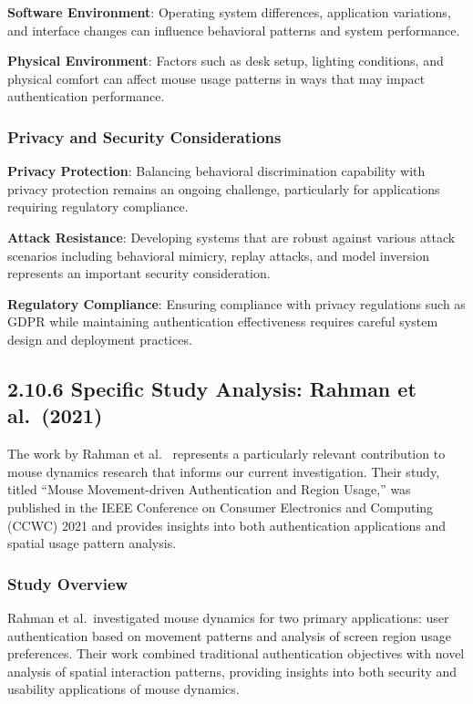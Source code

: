 \documentclass[
  12pt,
  a4paper,
]{report}
\begin{document}
\textbf{Software Environment}: Operating system differences, application
variations, and interface changes can influence behavioral patterns and
system performance.

\textbf{Physical Environment}: Factors such as desk setup, lighting
conditions, and physical comfort can affect mouse usage patterns in ways
that may impact authentication performance.

\subsubsection{Privacy and Security
Considerations}\label{privacy-and-security-considerations-1}

\textbf{Privacy Protection}: Balancing behavioral discrimination
capability with privacy protection remains an ongoing challenge,
particularly for applications requiring regulatory compliance.

\textbf{Attack Resistance}: Developing systems that are robust against
various attack scenarios including behavioral mimicry, replay attacks,
and model inversion represents an important security consideration.

\textbf{Regulatory Compliance}: Ensuring compliance with privacy
regulations such as GDPR while maintaining authentication effectiveness
requires careful system design and deployment practices.

\subsection{2.10.6 Specific Study Analysis: Rahman et
al.~(2021)}\label{specific-study-analysis-rahman-et-al.-2021}

The work by Rahman et al.~\cite{rahman2021} represents a particularly
relevant contribution to mouse dynamics research that informs our
current investigation. Their study, titled ``Mouse Movement-driven
Authentication and Region Usage,'' was published in the IEEE Conference
on Consumer Electronics and Computing (CCWC) 2021 and provides insights
into both authentication applications and spatial usage pattern
analysis.

\subsubsection{Study Overview}\label{study-overview}

Rahman et al.~investigated mouse dynamics for two primary applications:
user authentication based on movement patterns and analysis of screen
region usage preferences. Their work combined traditional authentication
objectives with novel analysis of spatial interaction patterns,
providing insights into both security and usability applications of
mouse dynamics.
\end{document}
